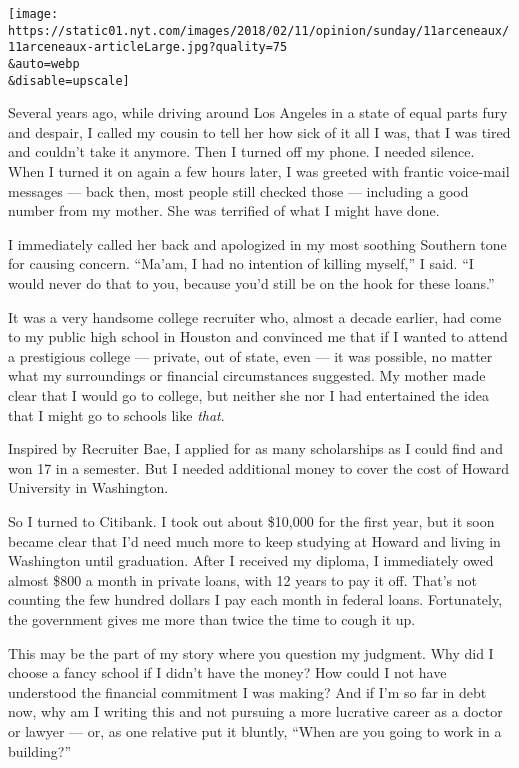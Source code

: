 \texttt{[image: https://static01.nyt.com/images/2018/02/11/opinion/sunday/11arceneaux/11arceneaux-articleLarge.jpg?quality=75\\\&auto=webp\\\&disable=upscale]}

Several years ago, while driving around Los Angeles in a state of equal
parts fury and despair, I called my cousin to tell her how sick of it
all I was, that I was tired and couldn't take it anymore. Then I turned
off my phone. I needed silence. When I turned it on again a few hours
later, I was greeted with frantic voice-mail messages --- back then,
most people still checked those --- including a good number from my
mother. She was terrified of what I might have done.

I immediately called her back and apologized in my most soothing
Southern tone for causing concern. ``Ma'am, I had no intention of
killing myself,'' I said. ``I would never do that to you, because you'd
still be on the hook for these loans.''

It was a very handsome college recruiter who, almost a decade earlier,
had come to my public high school in Houston and convinced me that if I
wanted to attend a prestigious college --- private, out of state, even
--- it was possible, no matter what my surroundings or financial
circumstances suggested. My mother made clear that I would go to
college, but neither she nor I had entertained the idea that I might go
to schools like \emph{that}.

Inspired by Recruiter Bae, I applied for as many scholarships as I could
find and won 17 in a semester. But I needed additional money to cover
the cost of Howard University in Washington.

So I turned to Citibank. I took out about \$10,000 for the first year,
but it soon became clear that I'd need much more to keep studying at
Howard and living in Washington until graduation. After I received my
diploma, I immediately owed almost \$800 a month in private loans, with
12 years to pay it off. That's not counting the few hundred dollars I
pay each month in federal loans. Fortunately, the government gives me
more than twice the time to cough it up.

This may be the part of my story where you question my judgment. Why did
I choose a fancy school if I didn't have the money? How could I not have
understood the financial commitment I was making? And if I'm so far in
debt now, why am I writing this and not pursuing a more lucrative career
as a doctor or lawyer --- or, as one relative put it bluntly, ``When are
you going to work in a building?''

